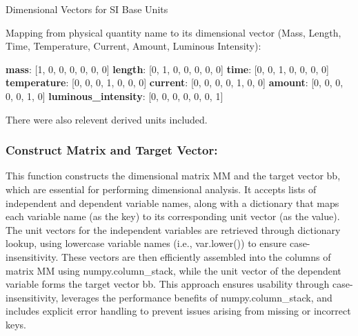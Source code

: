 \documentclass{article}
\begin{document}
\begin{algorithm}[H]
\SetAlgoLined
\caption{Dimensional Vectors for SI Base Units}
\label{alg:unit_table} %

Mapping from physical quantity name to its dimensional vector (Mass, Length, Time, Temperature, Current, Amount, Luminous Intensity):\;
\vspace{0.5em} %

\textbf{mass}:                 [1, 0, 0, 0, 0, 0, 0]\;
\textbf{length}:               [0, 1, 0, 0, 0, 0, 0]\;
\textbf{time}:                 [0, 0, 1, 0, 0, 0, 0]\;
\textbf{temperature}:          [0, 0, 0, 1, 0, 0, 0]\;
\textbf{current}:              [0, 0, 0, 0, 1, 0, 0]\;
\textbf{amount}:               [0, 0, 0, 0, 0, 1, 0]\;
\textbf{luminous\_intensity}:   [0, 0, 0, 0, 0, 0, 1]\; %

\end{algorithm}


There were also relevent derived units included.\\ 

\subsubsection{Construct Matrix and Target Vector:}

This function constructs the dimensional matrix MM and the target vector bb, which are essential for performing dimensional analysis. It accepts lists of independent and dependent variable names, along with a dictionary that maps each variable name (as the key) to its corresponding unit vector (as the value). The unit vectors for the independent variables are retrieved through dictionary lookup, using lowercase variable names (i.e., var.lower()) to ensure case-insensitivity. These vectors are then efficiently assembled into the columns of matrix MM using numpy.column\_stack, while the unit vector of the dependent variable forms the target vector bb. This approach ensures usability through case-insensitivity, leverages the performance benefits of numpy.column\_stack, and includes explicit error handling to prevent issues arising from missing or incorrect keys.\\
\end{document}
